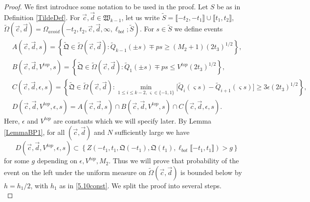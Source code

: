 \begin{proof} We first introduce some notation to be used in the proof. Let $S$ be as in Definition \ref{TildeDef}. For $\vec{c}, \vec{d} \in \mathfrak{W}_{k-1}$, let us write $\tilde{S} = \llbracket -t_2,-t_1\rrbracket \cup \llbracket t_1,t_2\rrbracket$, $\tilde{\Omega}(\vec{c},\vec{d}) = \Omega_{avoid}(-t_2, t_2, \vec{c}, \vec{d}, \infty, \ell_{bot}; \tilde{S})$. For $s\in\tilde{S}$ we define events
	\begin{equation}
	\begin{split}
	&A(\vec{c}, \vec{d},s) = \left\{\tilde{\mathfrak{Q}} \in \tilde\Omega(\vec{c},\vec{d}): \tilde Q_{k-1}(\pm s) \mp ps \geq (M_2 + 1) (2t_3)^{1/2} \right\}, \\
	&B(\vec{c},\vec{d},V^{top},s) = \left\{ \tilde{\mathfrak{Q}} \in \tilde\Omega(\vec{c},\vec{d}): \tilde Q_{1}(\pm s) \mp ps \leq V^{top} (2t_3)^{1/2} \right\},\\
	&C(\vec{c}, \vec{d}, \epsilon, s) = \left\{ \tilde{\mathfrak{Q}} \in \tilde\Omega(\vec{c},\vec{d}): \min_{1\leq i\leq k-2, \, \varsigma \in \{-1, 1\}} \big[\tilde Q_{i}(\varsigma s) - \tilde Q_{i+1}(\varsigma s)\big] \geq 3\epsilon (2t_3)^{1/2} \right\},\\
	&D(\vec{c},\vec{d},V^{top},\epsilon,s) = A(\vec{c}, \vec{d},s) \cap B(\vec{c},\vec{d},V^{top},s) \cap C(\vec{c}, \vec{d}, \epsilon, s).
	\end{split}
	\end{equation}
	Here, $\epsilon$ and $V^{top}$ are constants which we will specify later. By Lemma \ref{LemmaBP1}, for all $(\vec{c},\vec{d})$ and $N$ sufficiently large we have $$D(\vec{c},\vec{d},V^{top},\epsilon,s)  \subset \left\{Z\left(  -t_1, t_1, \mathfrak{Q}(-t_1), \mathfrak{Q}(t_1), \ell_{bot}\llbracket -t_1, t_1\rrbracket\right) > g\right\}$$
	for some $g$ depending on $\epsilon,V^{top},M_2$. Thus we will prove that probability of the event on the left under the uniform measure on $\tilde\Omega(\vec{c},\vec{d})$ is bounded below by $h = h_1/2$, with $h_1$ as in \eqref{5.10const}. We split the proof into several steps.\\
	

\end{proof}
